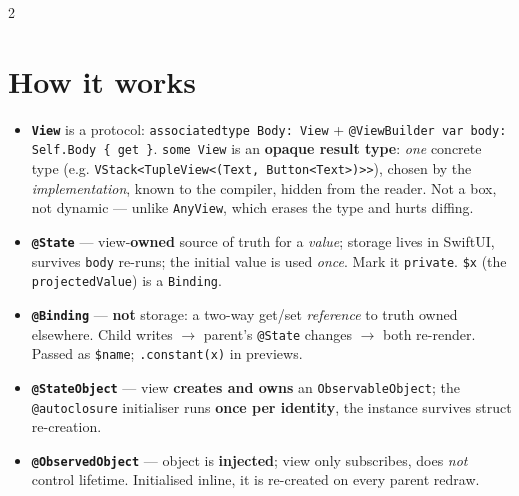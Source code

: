 \documentclass[8pt]{extarticle}
\begin{document}



\begin{multicols}{2}
\raggedright

\section{How it works}
\begin{itemize}
  \item \textbf{\texttt{View}} is a protocol: \texttt{associatedtype Body: View} +
        \texttt{@ViewBuilder var body: Self.Body \{ get \}}. \texttt{some View} is an
        \textbf{opaque result type}: \emph{one} concrete type (e.g.
        \texttt{VStack<TupleView<(Text, Button<Text>)>>}), chosen by the \emph{implementation},
        known to the compiler, hidden from the reader. Not a box, not dynamic — unlike \texttt{AnyView},
        which erases the type and hurts diffing.
  \item \textbf{\texttt{@State}} — view-\textbf{owned} source of truth for a \emph{value}; storage lives
        in SwiftUI, survives \texttt{body} re-runs; the initial value is used \emph{once}. Mark it
        \texttt{private}. \texttt{\$x} (the \texttt{projectedValue}) is a \texttt{Binding}.
  \item \textbf{\texttt{@Binding}} — \textbf{not} storage: a two-way get/set \emph{reference} to truth
        owned elsewhere. Child writes $\to$ parent's \texttt{@State} changes $\to$ both re-render.
        Passed as \texttt{\$name}; \texttt{.constant(x)} in previews.
  \item \textbf{\texttt{@StateObject}} — view \textbf{creates and owns} an \texttt{ObservableObject};
        the \texttt{@autoclosure} initialiser runs \textbf{once per identity}, the instance survives
        struct re-creation.
  \item \textbf{\texttt{@ObservedObject}} — object is \textbf{injected}; view only subscribes, does
        \emph{not} control lifetime. Initialised inline, it is re-created on every parent redraw.

\end{itemize}
\end{multicols}
\end{document}
